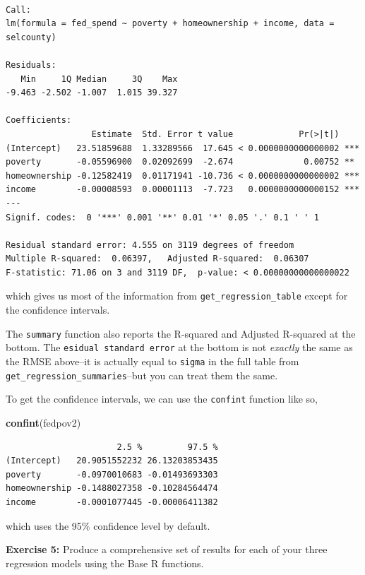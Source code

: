 \documentclass[
]{book}
\makeatletter
\newenvironment{Shaded}{\begin{snugshade}}{\end{snugshade}}
\newcommand{\FunctionTok}[1]{\textcolor[rgb]{0.27,0.27,0.27}{\textbf{#1}}}
\newcommand{\NormalTok}[1]{#1}
\newenvironment{kframe}{%
\medskip{}
\setlength{\fboxsep}{.8em}
 \def\at@end@of@kframe{}%
 \ifinner\ifhmode%
  \def\at@end@of@kframe{\end{minipage}}%
  \begin{minipage}{\columnwidth}%
 \fi\fi%
 \def\FrameCommand##1{\hskip\@totalleftmargin \hskip-\fboxsep
 \colorbox{shadecolor}{##1}\hskip-\fboxsep
     \hskip-\linewidth \hskip-\@totalleftmargin \hskip\columnwidth}%
 \MakeFramed {\advance\hsize-\width
   \@totalleftmargin\z@ \linewidth\hsize
   \@setminipage}}%
 {\par\unskip\endMakeFramed%
 \at@end@of@kframe}
\renewenvironment{Shaded}{\begin{kframe}}{\end{kframe}}
\newenvironment{rmdblock}[1]
  {\begin{shaded*}
  }
  {\end{shaded*}
  }
\newenvironment{learncheck}
  {\begin{rmdblock}{warning}}
  {\end{rmdblock}}
\makeatother
\begin{document}
\begin{verbatim}

Call:
lm(formula = fed_spend ~ poverty + homeownership + income, data = selcounty)

Residuals:
   Min     1Q Median     3Q    Max 
-9.463 -2.502 -1.007  1.015 39.327 

Coefficients:
                 Estimate  Std. Error t value             Pr(>|t|)    
(Intercept)   23.51859688  1.33289566  17.645 < 0.0000000000000002 ***
poverty       -0.05596900  0.02092699  -2.674              0.00752 ** 
homeownership -0.12582419  0.01171941 -10.736 < 0.0000000000000002 ***
income        -0.00008593  0.00001113  -7.723   0.0000000000000152 ***
---
Signif. codes:  0 '***' 0.001 '**' 0.01 '*' 0.05 '.' 0.1 ' ' 1

Residual standard error: 4.555 on 3119 degrees of freedom
Multiple R-squared:  0.06397,   Adjusted R-squared:  0.06307 
F-statistic: 71.06 on 3 and 3119 DF,  p-value: < 0.00000000000000022
\end{verbatim}

which gives us most of the information from \texttt{get\_regression\_table} except for the confidence intervals.

The \texttt{summary} function also reports the R-squared and Adjusted R-squared at the bottom. The \texttt{esidual\ standard\ error} at the bottom is not \emph{exactly} the same as the RMSE above--it is actually equal to \texttt{sigma} in the full table from \texttt{get\_regression\_summaries}--but you can treat them the same.

To get the confidence intervals, we can use the \texttt{confint} function like so,

\begin{Shaded}
\begin{Highlighting}[]
\FunctionTok{confint}\NormalTok{(fedpov2)}
\end{Highlighting}
\end{Shaded}

\begin{verbatim}
                      2.5 %         97.5 %
(Intercept)   20.9051552232 26.13203853435
poverty       -0.0970010683 -0.01493693303
homeownership -0.1488027358 -0.10284564474
income        -0.0001077445 -0.00006411382
\end{verbatim}

which uses the 95\% confidence level by default.

\begin{learncheck}
\textbf{Exercise 5:} Produce a comprehensive set of results for each of
your three regression models using the Base R functions.
\end{learncheck}
\end{document}
